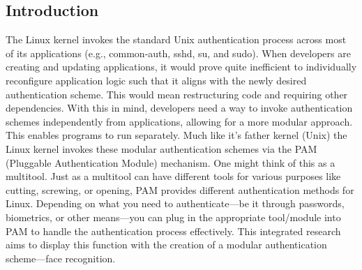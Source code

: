 \documentclass[
]{article}
\begin{document}
\begin{multicols}{2}
\section{Introduction}
The \cite{viola2001rapid} Linux \cite{ahonen2004} kernel \cite{geisshirt2007} invokes the standard Unix authentication process across most of its applications (e.g., common-auth, sshd, su, and sudo). When developers are creating and updating applications, it would prove quite inefficient to individually reconfigure application logic such that it aligns with the newly desired authentication scheme. This would mean restructuring code and requiring other dependencies. With this in mind, developers need a way to invoke authentication schemes independently from applications, allowing for a more modular approach. This enables programs to run separately. Much like it's father kernel (Unix) the Linux kernel invokes these modular authentication schemes via the PAM (Pluggable Authentication Module) mechanism. One might think of this as a multitool. Just as a multitool can have different tools for various purposes like cutting, screwing, or opening, PAM provides different authentication methods for Linux. Depending on what you need to authenticate—be it through passwords, biometrics, or other means—you can plug in the appropriate tool/module into PAM to handle the authentication process effectively. This integrated research aims to display this function with the creation of a modular authentication scheme—face recognition.


\end{multicols}
\end{document}

